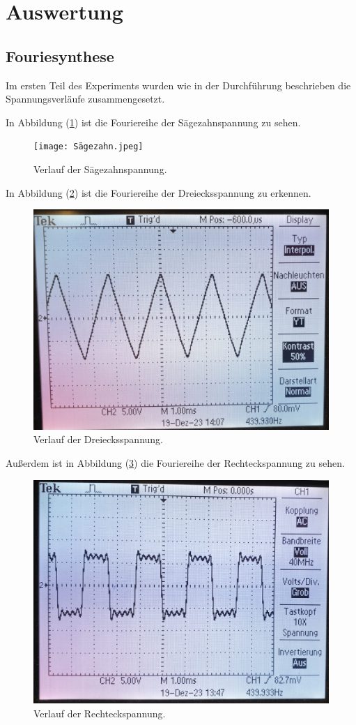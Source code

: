 \section{Auswertung}
\label{sec:Auswertung}

\subsection{Fouriesynthese}
Im ersten Teil des Experiments wurden wie in der Durchführung beschrieben die Spannungsverläufe zusammengesetzt. 

In Abbildung (\ref{fig:plot1}) ist die Fouriereihe der Sägezahnspannung zu sehen.
\begin{figure}[H]
  \centering
  \texttt{[image: Sägezahn.jpeg]}
  \caption{Verlauf der Sägezahnspannung.}
  \label{fig:plot1}
\end{figure}

In Abbildung (\ref{fig:plot2}) ist die Fouriereihe der Dreiecksspannung zu erkennen. 
\begin{figure}[H]
  \centering
  \includegraphics[width = 0.6\linewidth]{Dreieck.jpeg}
  \caption{Verlauf der Dreiecksspannung.}
  \label{fig:plot2}
\end{figure}

Außerdem ist in Abbildung (\ref{fig:plot3}) die Fouriereihe der Rechteckspannung zu sehen.
\begin{figure}[H]
  \centering
  \includegraphics[width = 0.6\linewidth]{Viereck.jpeg}
  \caption{Verlauf der Rechteckspannung.}
  \label{fig:plot3}
\end{figure}

